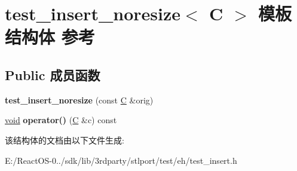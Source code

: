 \hypertarget{structtest__insert__noresize}{}\section{test\+\_\+insert\+\_\+noresize$<$ C $>$ 模板结构体 参考}
\label{structtest__insert__noresize}
\subsection*{Public 成员函数}
\begin{DoxyCompactItemize}
\item 
\mbox{\label{structtest__insert__noresize_ad9f36c32677a26d9c546c53ce436cc6c}} 
{\bfseries test\+\_\+insert\+\_\+noresize} (const \hyperlink{struct_c}{C} \&orig)
\item 
\mbox{\label{structtest__insert__noresize_a008c0b5415b9f54e5750733931db865d}} 
\hyperlink{interfacevoid}{void} {\bfseries operator()} (\hyperlink{struct_c}{C} \&c) const
\end{DoxyCompactItemize}


该结构体的文档由以下文件生成\+:\begin{DoxyCompactItemize}
\item 
E\+:/\+React\+O\+S-\/0../sdk/lib/3rdparty/stlport/test/eh/test\+\_\+insert.\+h\end{DoxyCompactItemize}
